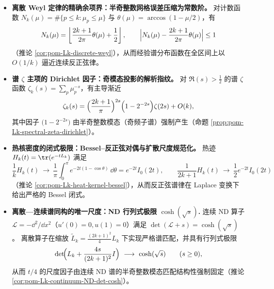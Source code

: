 \begin{enumerate}
\begin{itemize}
    \item \textbf{离散 Weyl 定律的精确余项界：半奇整数网格误差压缩为常数阶。}
    对计数函数 \(N_k(\mu)=\#\{p\le k:\mu_p\le\mu\}\) 与
    \(
    \theta(\mu)=\arccos(1-\mu/2)
    \)，有
    \[
    N_k(\mu)=\left\lfloor \frac{2k+1}{2\pi}\theta(\mu)+\frac12\right\rfloor,\qquad
    \Bigl|N_k(\mu)-\frac{2k+1}{2\pi}\theta(\mu)\Bigr|\le 1
    \]
    （推论 \ref{cor:pom-Lk-discrete-weyl}），从而经验谱分布函数在全区间上以 \(O(1/k)\) 逼近连续反正弦律。

    \item \textbf{谱 \texorpdfstring{\(\zeta\)}{zeta} 主项的 Dirichlet 因子：奇模态投影的解析指纹。}
    对 \(\Re(s)>\tfrac12\) 的谱 \(\zeta\) 函数 \(\zeta_k(s)=\sum_p\mu_p^{-s}\)，有主导渐近
    \[
    \zeta_k(s)=\Bigl(\frac{2k+1}{\pi}\Bigr)^{2s}\Bigl(1-2^{-2s}\Bigr)\zeta(2s)+O(k),
    \]
    其中因子 \(\bigl(1-2^{-2s}\bigr)\) 由半奇整数模态（奇频子谱）强制产生（命题 \ref{prop:pom-Lk-spectral-zeta-dirichlet}）。

    \item \textbf{热核密度的闭式极限：Bessel--反正弦对偶与扩散尺度规范化。}
    热迹 \(H_k(t)=\tr(e^{-tL_k})\) 满足
    \[
    \frac1k H_k(t)\ \longrightarrow\ \frac{1}{\pi}\int_0^\pi e^{-2t(1-\cos\theta)}\,\dd\theta
    =e^{-2t}I_0(2t),
    \qquad
    \frac{1}{2k+1}H_k(t)\ \longrightarrow\ \frac12 e^{-2t}I_0(2t)
    \]
    （推论 \ref{cor:pom-Lk-heat-kernel-bessel}），从而反正弦谱律在 Laplace 变换下给出严格的 Bessel 闭式。

    \item \textbf{离散—连续谱同构的唯一尺度：ND 行列式极限 \texorpdfstring{\(\cosh(\sqrt{s})\)}{cosh(sqrt(s))}.}
    连续 ND 算子 \(\mathcal L=-\dd^2/\dd x^2\)（\(u'(0)=0,u(1)=0\)）满足 \(\det(\mathcal L+s)=\cosh(\sqrt{s})\)。
    离散算子在缩放
    \(
    \widetilde L_k=\frac{(2k+1)^2}{4}L_k
    \)
    下实现严格谱匹配，并具有行列式极限
    \[
    \det\!\Bigl(L_k+\frac{4s}{(2k+1)^2}I\Bigr)\ \longrightarrow\ \cosh(\sqrt{s})\qquad(s\ge 0),
    \]
    从而 \(t/4\) 的尺度因子由连续 ND 谱的半奇整数模态匹配结构性强制固定（推论 \ref{cor:pom-Lk-continuum-ND-det-cosh}）。

    

    
  \end{itemize}


\end{enumerate}
